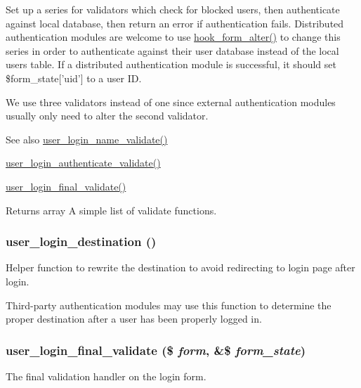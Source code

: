 \label{user_8module_ad839942de106a39384979b02221f64fb}
Set up a series for validators which check for blocked users, then authenticate against local database, then return an error if authentication fails. Distributed authentication modules are welcome to use \hyperlink{group__hooks_ga6df3cea27ae1407aeef4eae5444cb213}{hook\_\-form\_\-alter()} to change this series in order to authenticate against their user database instead of the local users table. If a distributed authentication module is successful, it should set \$form\_\-state\mbox{[}'uid'\mbox{]} to a user ID.

We use three validators instead of one since external authentication modules usually only need to alter the second validator.

\begin{DoxySeeAlso}{See also}
\hyperlink{user_8module_a8f96305420b1d860053ed6eaa50b8b34}{user\_\-login\_\-name\_\-validate()} 

\hyperlink{user_8module_a87098bdd1eef6b45820e23c53f8d8988}{user\_\-login\_\-authenticate\_\-validate()} 

\hyperlink{user_8module_aff194b554e3138ee149f97ed459d7d92}{user\_\-login\_\-final\_\-validate()} 
\end{DoxySeeAlso}
\begin{DoxyReturn}{Returns}
array A simple list of validate functions. 
\end{DoxyReturn}
\hypertarget{user_8module_ae7cf007030b2bfa8f13d0b18b142a154}{
\subsubsection[{user\_\-login\_\-destination}]{\setlength{\rightskip}{0pt plus 5cm}user\_\-login\_\-destination ()}}
\label{user_8module_ae7cf007030b2bfa8f13d0b18b142a154}
Helper function to rewrite the destination to avoid redirecting to login page after login.

Third-\/party authentication modules may use this function to determine the proper destination after a user has been properly logged in. \hypertarget{user_8module_aff194b554e3138ee149f97ed459d7d92}{
\subsubsection[{user\_\-login\_\-final\_\-validate}]{\setlength{\rightskip}{0pt plus 5cm}user\_\-login\_\-final\_\-validate (\$ {\em form}, \/  \&\$ {\em form\_\-state})}}
\label{user_8module_aff194b554e3138ee149f97ed459d7d92}
The final validation handler on the login form.

